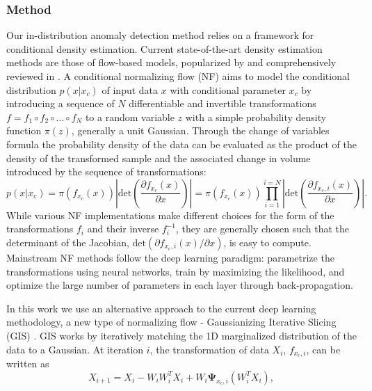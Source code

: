 \documentclass[a4paper,11pt]{article}
\begin{document}
\subsubsection{Method}
\label{sec:method}

Our in-distribution anomaly detection method relies on a framework for conditional density estimation. Current state-of-the-art density estimation methods are those of flow-based models, popularized by \cite{realnvp} and comprehensively reviewed in \cite{normalizing_flows}. A conditional normalizing flow (NF) aims to model the conditional distribution $p(x|x_c)$ of input data $x$ with conditional parameter $x_c$  by introducing a sequence of $N$ differentiable and invertible transformations $f = f_1 \circ f_2 \circ \dots \circ f_N $ to a random variable $z$ with a simple probability density function $\pi (z)$, generally a unit Gaussian. Through the change of variables formula the probability density of the data can be evaluated as the product of the density of the transformed sample and the associated change in volume introduced by the sequence of transformations: 
\begin{equation}
    \label{eq:density}
    p(x|x_c) = \pi(f_{x_c}(x)) \left| \mathrm{det} \left(\frac{\partial f_{x_c}(x)}{\partial x} \right) \right| =  \pi(f_{x_c}(x)) \prod_{i=1}^{i=N} \left| \mathrm{det} \left(\frac{\partial f_{x_c,i}(x)}{\partial x} \right) \right| .
\end{equation}
While various NF implementations make different choices for the form of the transformations $f_i$ and their inverse $f_i^{-1}$, they are generally chosen such that the determinant of the Jacobian, $\mathrm{det} (\partial f_{x_c,i}(x)/\partial x)$, is easy to compute. Mainstream NF methods follow the deep learning paradigm: parametrize the transformations using neural networks, train by maximizing the likelihood, and optimize the large number of parameters in each layer through back-propagation.

In this work we use an alternative approach to the current deep learning methodology, a new type of normalizing flow - Gaussianizing Iterative Slicing (GIS) \cite{sig}. GIS works by iteratively matching the 1D marginalized distribution of the data to a Gaussian. 
At iteration $i$, the transformation of data $X_i$, $f_{x_c,i}$, can be written as
\begin{equation}
X_{i+1} = X_i - W_iW_i^TX_i + W_i \mathbf{\Psi}_{x_c,i}(W_i^T X_i),
\end{equation}
\end{document}
